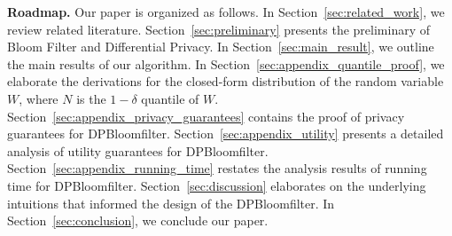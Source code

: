 {\bf Roadmap.} Our paper is organized as follows. In Section~\ref{sec:related_work}, we review related literature.
Section~\ref{sec:preliminary} presents the preliminary of Bloom Filter and  Differential Privacy. In Section~\ref{sec:main_result}, we outline the main results of our algorithm. 
In Section~\ref{sec:appendix_quantile_proof}, we elaborate the derivations for the closed-form distribution of the random variable $W$, where $N$ is the $1 - \delta$ quantile of $W$. 
Section~\ref{sec:appendix_privacy_guarantees} contains the proof of privacy guarantees for DPBloomfilter.
Section~\ref{sec:appendix_utility} presents a detailed analysis of utility guarantees for DPBloomfilter.
Section~\ref{sec:appendix_running_time} restates the analysis results of running time for DPBloomfilter.
Section~\ref{sec:discussion} elaborates on the underlying intuitions that informed the design of the DPBloomfilter.
In Section~\ref{sec:conclusion}, we conclude our paper.








